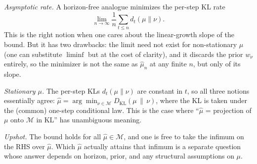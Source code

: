 \documentclass[fontsize=11pt, parskip=half]{scrartcl}
\theoremstyle{definition}
\newcommand{\Mc}{\mathcal{M}}
\begin{document}
\textit{Asymptotic rate.} A horizon-free analogue minimizes the per-step KL
rate $$\lim_{n \to \infty} \frac{1}{n} \sum_{t \leq n} d_t(\mu \parallel \nu).$$ This is the right notion when one cares about the linear-growth slope of the bound. But it has two drawbacks: the limit need not exist for non-stationary $\mu$ (one can substitute $\liminf$ but at the cost of clarity), and it discards the prior $w_\nu$ entirely, so the minimizer is not the same as $\hat\mu_n$ at any finite $n$, but only of its slope.

\textit{Stationary $\mu$.} The per-step KLs $d_t(\mu \parallel \nu)$ are constant in $t$, so all three notions essentially agree: $\hat\mu = \arg\min_{\nu \in \Mc} D_{\text{KL}}(\mu \,\|\, \nu)$, where the KL is taken under the (common) one-step conditional law. This is the case where ``$\hat\mu$ = projection of $\mu$ onto $\Mc$ in KL'' has unambiguous meaning.

\textit{Upshot.} The bound holds for all $\hat\mu \in \Mc$, and one is free
to take the infimum on the RHS over $\hat\mu$. Which $\hat\mu$ actually
attains that infimum is a separate question whose answer depends on horizon,
prior, and any structural assumptions on $\mu$.



\end{document}
